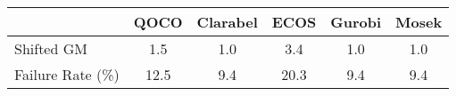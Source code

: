 \begin{tabular}{lccccc}
  \hline
   & \textbf{QOCO} & \textbf{Clarabel} & \textbf{ECOS} & \textbf{Gurobi} & \textbf{Mosek} \\ \hline
  Shifted GM & 1.5 & 1.0 & 3.4 & 1.0 & 1.0 \\ 
  Failure Rate (\%) & 12.5 & 9.4 & 20.3 & 9.4 & 9.4 \\ \hline 
\end{tabular}
